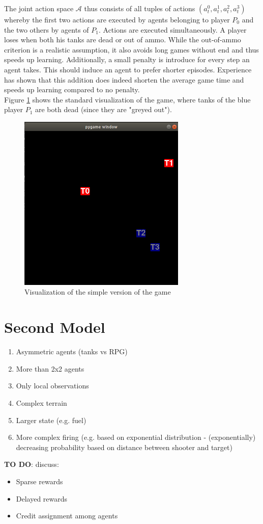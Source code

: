 The joint action space $\mathcal{A}$ thus consists of all tuples of actions $(a_t^0, a_t^1, a_t^2, a_t^3)$ whereby the first two actions are executed by agents belonging to player $P_0$ and the two others by agents of $P_1$. Actions are executed simultaneously. A player loses when both his tanks are dead or out of ammo. While the out-of-ammo criterion is a realistic assumption, it also avoids long games without end and thus speeds up learning. Additionally, a small penalty is introduce for every step an agent takes. This should induce an agent to prefer shorter episodes. Experience has shown that this addition does indeed shorten the average game time and speeds up learning compared to no penalty.\\
Figure \ref{fig:game_visual} shows the standard visualization of the game, where tanks of the blue player $P_1$ are both dead (since they are "greyed out").

\begin{figure}[htp]
    \centering
    \includegraphics[width=8cm]{images/game_visual.png}
    \caption{Visualization of the simple version of the game}
    \label{fig:game_visual}
\end{figure}



\section{Second Model}
\begin{enumerate}
    \item Asymmetric agents (tanks vs RPG)
    \item More than 2x2 agents
    \item Only local observations
    \item Complex terrain
    \item Larger state (e.g. fuel)
    \item More complex firing (e.g. based on exponential distribution - (exponentially) decreasing probability based on distance between shooter and target)
\end{enumerate}

\textbf{TO DO}: discuss:
\begin{itemize}
    \item Sparse rewards
    \item Delayed rewards
    \item Credit assignment among agents
\end{itemize}